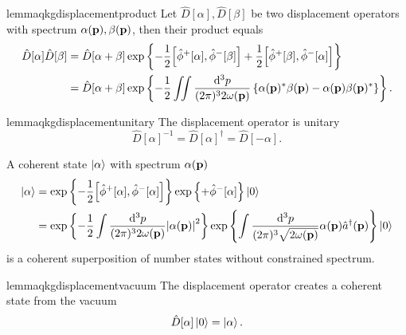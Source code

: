 \begin{restatable}{lemma}{qkgdisplacementproduct}\label{thm:qkg_displacement_product}
	Let $\hat{D}[\alpha],\hat{D}[\beta]$ be two displacement operators with spectrum $\alpha(\vb{p}),\beta(\vb{p})$, then their product equals
	\begin{equation}\label{eq:qkg_displacement_product}
		\begin{split}
			\hat{D}[\alpha]
			\hat{D}[\beta]
			&=
			\hat{D}[\alpha+\beta]
			\exp\left\{
				-
				\frac{1}{2}
				\comm{\hat\phi^+[\alpha]}{\hat\phi^-[\beta]}
				+
				\frac{1}{2}
				\comm{\hat\phi^+[\beta]}{\hat\phi^-[\alpha]}
			\right\}
			\\
			&=
			\hat{D}[\alpha+\beta]
			\exp\left\{
				-
				\frac{1}{2}
				\iint\frac{\dd[3]{p}}{(2\pi)^32\omega(\vb{p})}
				\left\{
					\alpha(\vb{p})^*
					\beta(\vb{p})
					-
					\alpha(\vb{p})
					\beta(\vb{p})^*
				\right\}
			\right\}
			.
		\end{split}
	\end{equation}
\end{restatable}
\begin{restatable}{lemma}{qkgdisplacementunitary}\label{thm:qkg_displacement_unitary}
	The displacement operator is unitary
	\begin{equation}
		\hat{D}[\alpha]^{-1}
		=
		\hat{D}[\alpha]^\dagger
		=
		\hat{D}[-\alpha]
		.
	\end{equation}
\end{restatable}
\begin{definition}
	A coherent state $\ket{\alpha}$ with spectrum $\alpha(\vb{p})$
	\begin{equation}
		\begin{split}
			\ket{\alpha}
			&=
			\exp\left\{
				-
				\frac{1}{2}
				\comm{\hat\phi^+[\alpha]}{\hat\phi^-[\alpha]}
			\right\}
			\exp\left\{
				+\hat\phi^-[\alpha]
			\right\}
			\ket{0}
			\\
			&=
			\exp\left\{
				-
				\frac{1}{2}
				\int\frac{\dd[3]{p}}{(2\pi)^32\omega(\vb{p})}
				\abs{\alpha(\vb{p})}^2
			\right\}
			\exp\left\{
				\int\frac{\dd[3]{p}}{(2\pi)^3\sqrt{2\omega(\vb{p})}}
				\alpha(\vb{p})
				\hat{a}^\dagger(\vb{p})
			\right\}
			\ket{0}
		\end{split}
	\end{equation}
	is a coherent superposition of number states without constrained spectrum.
\end{definition}
\begin{restatable}{lemma}{qkgdisplacementvacuum}\label{thm:qkg_displacement_vacuum}
	The displacement operator creates a coherent state from the vacuum
	\begin{equation}\label{eq:qkg_displacement_vacuum}
		\hat{D}[\alpha]
		\ket{0}
		=
		\ket{\alpha}
		.
	\end{equation}
\end{restatable}
